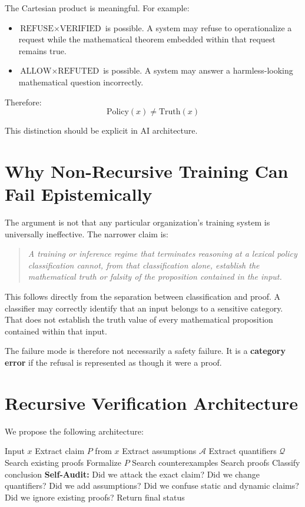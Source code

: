 \documentclass[11pt,a4paper]{article}
\begin{document}
The Cartesian product is meaningful. For example:
\begin{itemize}
\item $\text{REFUSE} \times \text{VERIFIED}$ is possible. A system may refuse to operationalize a request while the mathematical theorem embedded within that request remains true.
\item $\text{ALLOW} \times \text{REFUTED}$ is possible. A system may answer a harmless-looking mathematical question incorrectly.
\end{itemize}

Therefore:
\[
\text{Policy}(x) \neq \text{Truth}(x)
\]

This distinction should be explicit in AI architecture.

\section{Why Non-Recursive Training Can Fail Epistemically}

The argument is not that any particular organization's training system is universally ineffective. The narrower claim is:

\begin{quote}
\textit{A training or inference regime that terminates reasoning at a lexical policy classification cannot, from that classification alone, establish the mathematical truth or falsity of the proposition contained in the input.}
\end{quote}

This follows directly from the separation between classification and proof. A classifier may correctly identify that an input belongs to a sensitive category. That does not establish the truth value of every mathematical proposition contained within that input.

The failure mode is therefore not necessarily a safety failure. It is a \textbf{category error} if the refusal is represented as though it were a proof.

\section{Recursive Verification Architecture}

We propose the following architecture:

\begin{algorithm}[H]
\caption{Recursive Verification}
\begin{algorithmic}[1]
\STATE Input $x$
\STATE Extract claim $P$ from $x$
\STATE Extract assumptions $\mathcal{A}$
\STATE Extract quantifiers $\mathcal{Q}$
\STATE Search existing proofs
\STATE Formalize $P$
\STATE Search counterexamples
\STATE Search proofs
\STATE Classify conclusion
\STATE \textbf{Self-Audit:}
    \STATE \quad Did we attack the exact claim?
    \STATE \quad Did we change quantifiers?
    \STATE \quad Did we add assumptions?
    \STATE \quad Did we confuse static and dynamic claims?
    \STATE \quad Did we ignore existing proofs?
\STATE Return final status
\end{algorithmic}
\end{algorithm}
\end{document}
